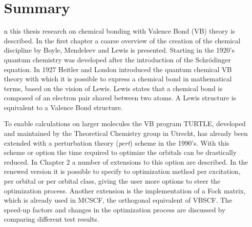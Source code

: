 \chapter*{Summary}
\label{summary}
\fancyhead[RO]{\thepage}
\fancyhead[LE]{\thepage}

\lettrine{}{}n this thesis research on chemical bonding with Valence Bond (VB) theory is described. In the first chapter a coarse overview of the creation of the chemical discipline by Boyle, Mendeleev and Lewis is presented. Starting in the 1920's quantum chemistry was developed after the introduction of the Schr\"{o}dinger equation. In 1927 Heitler and London introduced the quantum chemical VB theory with which it is possible to express a chemical bond in mathematical terms, based on the vision of Lewis. Lewis states that a chemical bond is composed of an electron pair shared between two atoms. A Lewis structure is equivalent to a Valence Bond structure. 

To enable calculations on larger molecules the VB program TURTLE, developed and maintained by the Theoretical Chemistry group in Utrecht, has already been extended with a perturbation theory (\textit{pert}) scheme in the 1990's. With this scheme or option the time required to optimize the orbitals can be drastically reduced. In Chapter 2 a number of extensions to this option are described. In the renewed version it is possible to specify to optimization method per excitation, per orbital or per orbital class, giving the user more options to steer the optimization process. Another extension is the implementation of a Fock matrix, which is already used in MCSCF, the orthogonal equivalent of VBSCF. The speed-up factors and changes in the optimization process are discussed by comparing different test results. 

